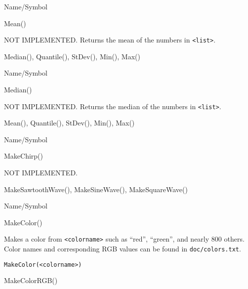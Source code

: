 \rl




\begin{desc}{Name/Symbol}
\item[Name/Symbol]	Mean()

\item[Description] 	NOT IMPLEMENTED. Returns the mean of the numbers in \verb+<list>+.

\item[Usage]		

\item[Example]	

\item[See Also]	Median(), Quantile(), StDev(), Min(), Max()
\end{desc}

\rl



\begin{desc}{Name/Symbol}
\item[Name/Symbol]	Median()

\item[Description]	NOT IMPLEMENTED. Returns the median of the numbers in \verb+<list>+.

\item[Usage]		

\item[Example]	

\item[See Also]	Mean(), Quantile(), StDev(), Min(), Max()
\end{desc}

\rl


\begin{desc}{Name/Symbol}
\item[Name/Symbol]	MakeChirp()  

\item[Description]	NOT IMPLEMENTED.

\item[Usage]		

\item[Example]	

\item[See Also]	MakeSawtoothWave(), MakeSineWave(), MakeSquareWave()
\end{desc}

\rl




\begin{desc}{Name/Symbol}
\item[Name/Symbol]	MakeColor()

\item[Description]	Makes a color from \verb+<colorname>+ such as ``red'', ``green'', and nearly 800 others.  Color names and corresponding RGB 
		values can be found in \texttt{doc/colors.txt}.

\item[Usage]
\begin{verbatim}
MakeColor(<colorname>)
\end{verbatim}

\item[Example]	

\item[See Also]	MakeColorRGB()
\end{desc}

